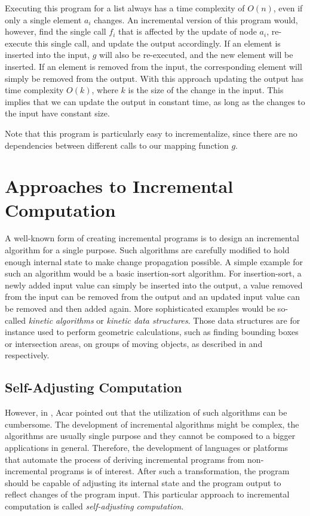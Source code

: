 Executing this program for a list always has a time complexity of $O(n)$, even if only a single element $a_i$ changes. An incremental version of this program would, however, find the single call $f_i$ that is affected by the update of node $a_i$, re-execute this single call, and update the output accordingly. If an element is inserted into the input, $g$ will also be re-executed, and the new element will be inserted. If an element is removed from the input, the corresponding element will simply be removed from the output. With this approach updating the output has time complexity $O(k)$, where $k$ is the size of the change in the input. This implies that we can update the output in constant time, as long as the changes to the input have constant size. 

Note that this program is particularly easy to incrementalize, since there are no dependencies between different calls to our mapping function $g$. 
\section{Approaches to Incremental Computation}


A well-known form of creating incremental programs is to design an incremental algorithm for a single purpose. Such algorithms are carefully modified to hold enough internal state to make change propagation possible. A simple example for such an algorithm would be a basic insertion-sort algorithm. For insertion-sort, a newly added input value can simply be inserted into the output, a value removed from the input can be removed from the output and an updated input value can be removed and then added again. More sophisticated examples would be so-called \textit{kinetic algorithms} or \textit{kinetic data structures}. Those data structures are for instance used to perform geometric calculations, such as finding bounding boxes or intersection areas, on groups of moving objects, as described in \cite{yu2008practical} and \cite{basch2004kinetic} respectively.

\subsection{Self-Adjusting Computation}

However, in \cite{Acar2005thesis}, Acar pointed out that the utilization of such algorithms can be cumbersome. The development of incremental algorithms might be complex, the algorithms are usually single purpose and they cannot be composed to a bigger applications in general. Therefore, the development of languages or platforms that automate the process of deriving incremental programs from non-incremental programs is of interest. After such a transformation, the program should be capable of adjusting its internal state and the program output to reflect changes of the program input. This particular approach to incremental computation is called \textit{self-adjusting computation}.

